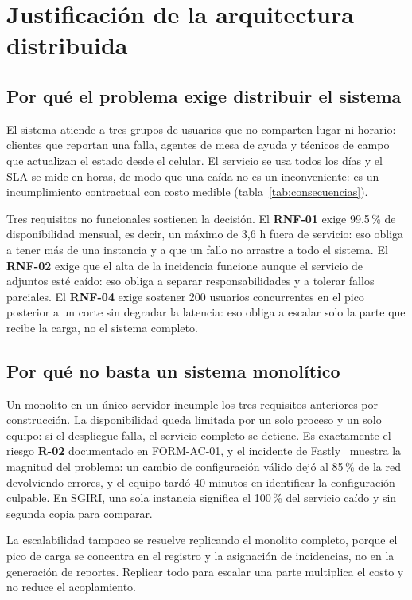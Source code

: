 ﻿\section{Justificación de la arquitectura distribuida}

\subsection{Por qué el problema exige distribuir el sistema}

El sistema atiende a tres grupos de usuarios que no comparten lugar ni horario: clientes que
reportan una falla, agentes de mesa de ayuda y técnicos de campo que actualizan el estado desde el
celular. El servicio se usa todos los días y el SLA se mide en horas, de modo que una caída no es
un inconveniente: es un incumplimiento contractual con costo medible
(tabla~\ref{tab:consecuencias}).

Tres requisitos no funcionales sostienen la decisión. El \textbf{RNF-01} exige 99,5\,\% de
disponibilidad mensual, es decir, un máximo de 3,6 h fuera de servicio: eso obliga a tener más de
una instancia y a que un fallo no arrastre a todo el sistema. El \textbf{RNF-02} exige que el alta
de la incidencia funcione aunque el servicio de adjuntos esté caído: eso obliga a separar
responsabilidades y a tolerar fallos parciales. El \textbf{RNF-04} exige sostener 200 usuarios
concurrentes en el pico posterior a un corte sin degradar la latencia: eso obliga a escalar solo la
parte que recibe la carga, no el sistema completo.

\subsection{Por qué no basta un sistema monolítico}

Un monolito en un único servidor incumple los tres requisitos anteriores por construcción. La
disponibilidad queda limitada por un solo proceso y un solo equipo: si el despliegue falla, el
servicio completo se detiene. Es exactamente el riesgo \textbf{R-02} documentado en FORM-AC-01, y
el incidente de Fastly~\cite{fastly2021} muestra la magnitud del problema: un cambio de
configuración válido dejó al 85\,\% de la red devolviendo errores, y el equipo tardó 40 minutos en
identificar la configuración culpable. En SGIRI, una sola instancia significa el 100\,\% del
servicio caído y sin segunda copia para comparar.

La escalabilidad tampoco se resuelve replicando el monolito completo, porque el pico de carga se
concentra en el registro y la asignación de incidencias, no en la generación de reportes. Replicar
todo para escalar una parte multiplica el costo y no reduce el acoplamiento.


